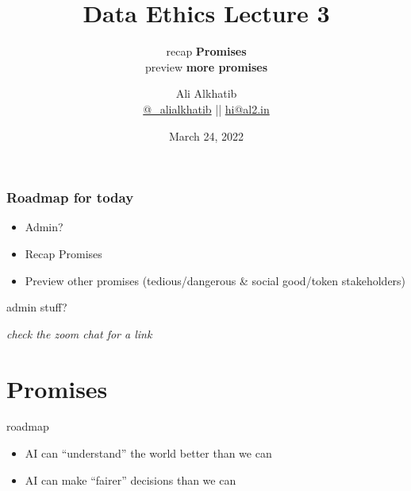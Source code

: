 \documentclass[aspectratio=43,17pt]{beamer} %
\title{Data Ethics Lecture 3}
\subtitle{recap {\bfseries Promises}\\preview {\bfseries more promises}}
\author[Ali Alkhatib]{{Ali Alkhatib}\\
\href{http://twitter.com/_alialkhatib}{@\_alialkhatib} || \href{mailto:hi@al2.in}{hi@al2.in}}
\date{March 24, 2022}
\newcommand{\onlyinsubfile}[1]{#1}
\newcommand{\notinsubfile}[1]{}
\begin{document}
\renewcommand{\onlyinsubfile}[1]{}
\renewcommand{\notinsubfile}[1]{#1}


\begin{frame}
\titlepage
\end{frame}

\begin{frame}[t]\frametitle{Roadmap for today}

\begin{itemize}
    \item Admin?
    \item Recap Promises
    \item Preview other promises (tedious/dangerous \& social good/token stakeholders)
\end{itemize}

\end{frame}

\begin{frame}{admin stuff?}
    
    \begin{itemize}
    \end{itemize}

\end{frame}


\begin{frame}[plain]

\centering
\emph{check the zoom chat for a link}

\end{frame}


\section{Promises}


\begin{frame}{roadmap}
\begin{itemize}
    \item AI can ``understand'' the world better than we can
    \item AI can make ``fairer'' decisions than we can
\end{itemize}

\end{frame}


\end{document}
